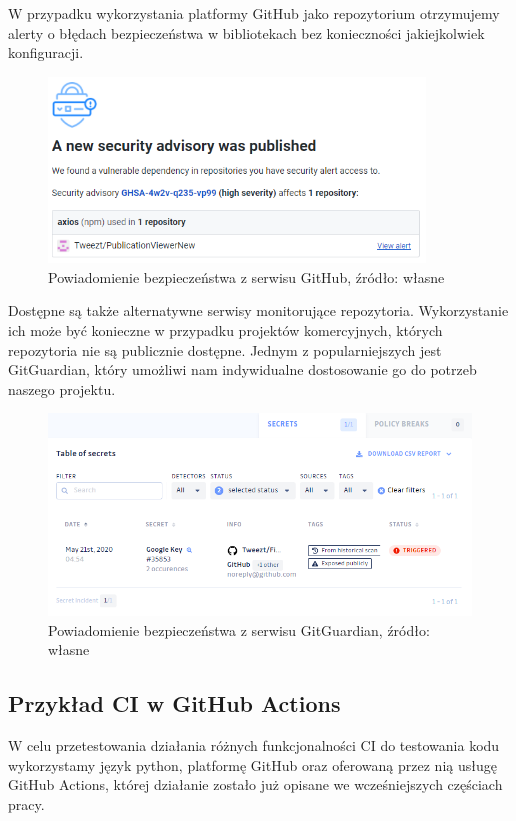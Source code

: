W przypadku wykorzystania platformy GitHub jako repozytorium otrzymujemy alerty o błędach bezpieczeństwa w bibliotekach bez konieczności jakiejkolwiek konfiguracji. 

\begin{figure}[htbp]
    \centering
    \includegraphics[width=10cm]{images/GitHubAlert.png}
    \caption{Powiadomienie bezpieczeństwa z serwisu GitHub, źródło: własne}
    \label{fig:githubalert}
\end{figure}

Dostępne są także alternatywne serwisy monitorujące repozytoria. Wykorzystanie ich może być konieczne w przypadku projektów komercyjnych, których repozytoria nie są publicznie dostępne. Jednym z popularniejszych jest GitGuardian, który umożliwi nam indywidualne dostosowanie go do potrzeb naszego projektu. 

\begin{figure}[htbp]
    \centering
    \includegraphics[width=13cm]{images/GitGuardian.png}
    \caption{Powiadomienie bezpieczeństwa z serwisu GitGuardian, źródło: własne}
    \label{fig:gitguardian}
\end{figure}

\subsection{Przykład CI w GitHub Actions}
W celu przetestowania działania różnych funkcjonalności CI do testowania kodu wykorzystamy język python, platformę GitHub oraz oferowaną przez nią usługę GitHub Actions, której działanie zostało już opisane we wcześniejszych częściach pracy.

